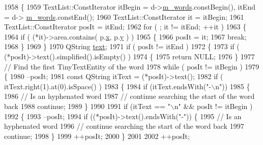 \begin{DoxyCode}
1958 \{
1959     TextList::ConstIterator itBegin = d->\hyperlink{classOkular_1_1TextPagePrivate_a36b703334a8775136cb4308209afd1cb}{m\_words}.constBegin(), itEnd = d->
      \hyperlink{classOkular_1_1TextPagePrivate_a36b703334a8775136cb4308209afd1cb}{m\_words}.constEnd();
1960     TextList::ConstIterator it = itBegin;
1961     TextList::ConstIterator posIt = itEnd;
1962     \textcolor{keywordflow}{for} ( ; it != itEnd; ++it )
1963     \{
1964         \textcolor{keywordflow}{if} ( (*it)->area.contains( p.\hyperlink{classOkular_1_1NormalizedPoint_a857f49b9bc7712430d167472ef9dbd94}{x}, p.\hyperlink{classOkular_1_1NormalizedPoint_ac2276daabda627d5f82bb1532c293047}{y} ) )
1965         \{
1966             posIt = it;
1967             \textcolor{keywordflow}{break};
1968         \}
1969     \}
1970     QString \hyperlink{classOkular_1_1TextPage_a5af682e8df70faec3e9e23792e6ac6b7}{text};
1971     \textcolor{keywordflow}{if} ( posIt != itEnd )
1972     \{
1973         \textcolor{keywordflow}{if} ( (*posIt)->text().simplified().isEmpty() )
1974         \{
1975             \textcolor{keywordflow}{return} NULL;
1976         \}
1977         \textcolor{comment}{// Find the first TinyTextEntity of the word}
1978         \textcolor{keywordflow}{while} ( posIt != itBegin )
1979         \{
1980             --posIt;
1981             \textcolor{keyword}{const} QString itText = (*posIt)->text();
1982             \textcolor{keywordflow}{if} ( itText.right(1).at(0).isSpace() )
1983             \{
1984                 \textcolor{keywordflow}{if} (itText.endsWith(\textcolor{stringliteral}{"-\(\backslash\)n"}))
1985                 \{
1986                     \textcolor{comment}{// Is an hyphenated word}
1987                     \textcolor{comment}{// continue searching the start of the word back}
1988                     \textcolor{keywordflow}{continue};
1989                 \}
1990                 
1991                 \textcolor{keywordflow}{if} (itText == \textcolor{stringliteral}{"\(\backslash\)n"} && posIt != itBegin )
1992                 \{
1993                     --posIt;
1994                     \textcolor{keywordflow}{if} ((*posIt)->text().endsWith(\textcolor{stringliteral}{"-"})) \{
1995                         \textcolor{comment}{// Is an hyphenated word}
1996                         \textcolor{comment}{// continue searching the start of the word back}
1997                         \textcolor{keywordflow}{continue};
1998                     \}
1999                     ++posIt;
2000                 \}
2001 
2002                 ++posIt;

\end{DoxyCode}
